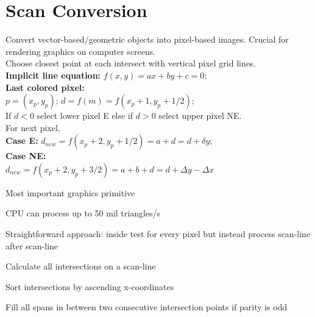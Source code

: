 \section{Scan Conversion}
 Convert vector-based/geometric objects into pixel-based images. Crucial for rendering graphics on computer screens. \\ 
Choose closest point at each intersect with vertical pixel grid lines. \\
\textbf{Implicit line equation:} $f(x,y) = ax + by + c = 0$;\\
\textbf{Last colored pixel:} \\
$p = (x_p, y_p)$; $d = f(m) = f(x_p + 1, y_p + 1/2)$;\\
If $d < 0$ select lower pixel E else if $d > 0$ select upper pixel NE. \\
For next pixel, \\
\textbf{Case E:} $d_{new} = f(x_p + 2, y_p + 1/2) = a + d = d + \delta{y}$; \\
\textbf{Case NE:} \\
$d_{new} = f(x_p + 2, y_p + 3/2) = a + b + d = d + \Delta{y} - \Delta{x}$

\begin{compactitem}
    \item Most important graphics primitive
    \item CPU can process up to 50 mil triangles/s
    \item Straightforward approach: inside test for every pixel but instead process scan-line after scan-line
\end{compactitem}
\begin{compactenum}
    \item Calculate all intersections on a scan-line
    \item Sort intersections by ascending x-coordinates
    \item Fill all spans in between two consecutive intersection points if parity is odd
\end{compactenum}
